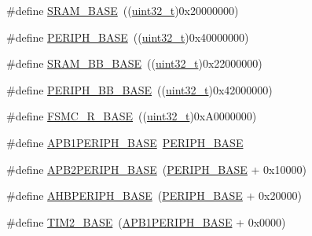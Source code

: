 \begin{DoxyCompactItemize}
\item 
\#define \hyperlink{group___peripheral__memory__map_ga05e8f3d2e5868754a7cd88614955aecc}{S\+R\+A\+M\+\_\+\+B\+A\+SE}~((\hyperlink{_p_e___types_8h_a33594304e786b158f3fb30289278f5af}{uint32\+\_\+t})0x20000000)
\item 
\#define \hyperlink{group___peripheral__memory__map_ga9171f49478fa86d932f89e78e73b88b0}{P\+E\+R\+I\+P\+H\+\_\+\+B\+A\+SE}~((\hyperlink{_p_e___types_8h_a33594304e786b158f3fb30289278f5af}{uint32\+\_\+t})0x40000000)
\item 
\#define \hyperlink{group___peripheral__memory__map_gad3548b6e2f017f39d399358f3ac98454}{S\+R\+A\+M\+\_\+\+B\+B\+\_\+\+B\+A\+SE}~((\hyperlink{_p_e___types_8h_a33594304e786b158f3fb30289278f5af}{uint32\+\_\+t})0x22000000)
\item 
\#define \hyperlink{group___peripheral__memory__map_gaed7efc100877000845c236ccdc9e144a}{P\+E\+R\+I\+P\+H\+\_\+\+B\+B\+\_\+\+B\+A\+SE}~((\hyperlink{_p_e___types_8h_a33594304e786b158f3fb30289278f5af}{uint32\+\_\+t})0x42000000)
\item 
\#define \hyperlink{group___peripheral__memory__map_gaddf0e199dccba83272b20c9fb4d3aaed}{F\+S\+M\+C\+\_\+\+R\+\_\+\+B\+A\+SE}~((\hyperlink{_p_e___types_8h_a33594304e786b158f3fb30289278f5af}{uint32\+\_\+t})0x\+A0000000)
\item 
\#define \hyperlink{group___peripheral__memory__map_ga45666d911f39addd4c8c0a0ac3388cfb}{A\+P\+B1\+P\+E\+R\+I\+P\+H\+\_\+\+B\+A\+SE}~\hyperlink{openmotestm_2library_2inc_2stm32f10x__map_8h_a9171f49478fa86d932f89e78e73b88b0}{P\+E\+R\+I\+P\+H\+\_\+\+B\+A\+SE}
\item 
\#define \hyperlink{group___peripheral__memory__map_ga25b99d6065f1c8f751e78f43ade652cb}{A\+P\+B2\+P\+E\+R\+I\+P\+H\+\_\+\+B\+A\+SE}~(\hyperlink{openmotestm_2library_2inc_2stm32f10x__map_8h_a9171f49478fa86d932f89e78e73b88b0}{P\+E\+R\+I\+P\+H\+\_\+\+B\+A\+SE} + 0x10000)
\item 
\#define \hyperlink{group___peripheral__memory__map_ga92eb5d49730765d2abd0f5b09548f9f5}{A\+H\+B\+P\+E\+R\+I\+P\+H\+\_\+\+B\+A\+SE}~(\hyperlink{openmotestm_2library_2inc_2stm32f10x__map_8h_a9171f49478fa86d932f89e78e73b88b0}{P\+E\+R\+I\+P\+H\+\_\+\+B\+A\+SE} + 0x20000)
\item 
\#define \hyperlink{group___peripheral__memory__map_ga00d0fe6ad532ab32f0f81cafca8d3aa5}{T\+I\+M2\+\_\+\+B\+A\+SE}~(\hyperlink{openmotestm_2library_2inc_2stm32f10x__map_8h_a45666d911f39addd4c8c0a0ac3388cfb}{A\+P\+B1\+P\+E\+R\+I\+P\+H\+\_\+\+B\+A\+SE} + 0x0000)
\item 

\end{DoxyCompactItemize}
